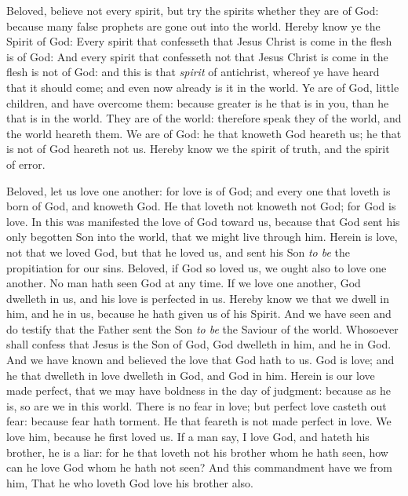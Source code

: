 \documentclass[11pt,letterpaper,oneside]{memoir}
\begin{document}
Beloved, believe not every spirit, but try the spirits whether they are
of God: because many false prophets are gone out into the world. Hereby
know ye the Spirit of God: Every spirit that confesseth that Jesus
Christ is come in the flesh is of God: And every spirit that confesseth
not that Jesus Christ is come in the flesh is not of God: and this is
that \emph{spirit} of antichrist, whereof ye have heard that it should
come; and even now already is it in the world. Ye are of God, little
children, and have overcome them: because greater is he that is in you,
than he that is in the world. They are of the world: therefore speak
they of the world, and the world heareth them. We are of God: he that
knoweth God heareth us; he that is not of God heareth not us. Hereby
know we the spirit of truth, and the spirit of error.

Beloved, let us love one another: for love is of God; and every one that
loveth is born of God, and knoweth God. He that loveth not knoweth not
God; for God is love. In this was manifested the love of God toward us,
because that God sent his only begotten Son into the world, that we
might live through him. Herein is love, not that we loved God, but that
he loved us, and sent his Son \emph{to be} the propitiation for our
sins. Beloved, if God so loved us, we ought also to love one another. No
man hath seen God at any time. If we love one another, God dwelleth in
us, and his love is perfected in us. Hereby know we that we dwell in
him, and he in us, because he hath given us of his Spirit. And we have
seen and do testify that the Father sent the Son \emph{to be} the
Saviour of the world. Whosoever shall confess that Jesus is the Son of
God, God dwelleth in him, and he in God. And we have known and believed
the love that God hath to us. God is love; and he that dwelleth in love
dwelleth in God, and God in him. Herein is our love made perfect, that
we may have boldness in the day of judgment: because as he is, so are we
in this world. There is no fear in love; but perfect love casteth out
fear: because fear hath torment. He that feareth is not made perfect in
love. We love him, because he first loved us. If a man say, I love God,
and hateth his brother, he is a liar: for he that loveth not his brother
whom he hath seen, how can he love God whom he hath not seen? And this
commandment have we from him, That he who loveth God love his brother
also.
\end{document}
